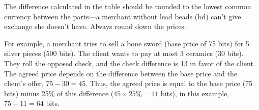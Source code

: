 
The difference calculated in the table should be rounded to the lowest common currency between the parts---a merchant without lead beads (bd) can't give exchange she doesn't have. Always round down the prices.

For example, a merchant tries to sell a bone sword (base price of 75 bits) for 5 silver pieces (500 bits). The client wants to pay at most 3 ceramics (30 bits). They roll the opposed check, and the check difference is 13 in favor of the client. The agreed price depends on the difference between the base price and the client's offer, $75-30=45$. Thus, the agreed price is equal to the base price (75 bits) minus 25\% of this difference ($45 \times 25\% = 11$ bits), in this example, $75-11=64$ bits.

